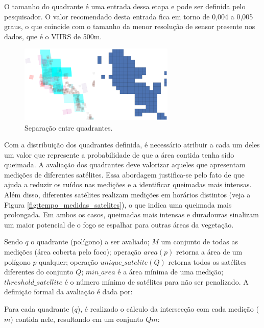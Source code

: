 \documentclass[cic,tc]{iiufrgs}
\begin{document}
O tamanho do quadrante é uma entrada dessa etapa e pode ser definida pelo pesquisador. O valor recomendado desta entrada fica em torno de 0,004 a 0,005 graus, o que coincide com o tamanho da menor resolução de sensor presente nos dados, que é o VIIRS de 500m. \par

\begin{figure}[H]
    \caption{Separação entre quadrantes.}
    \begin{center}
        \includegraphics[width=20em]{satellite_quads_split}
    \end{center}
    \label{fig:satellite_quads_split}
\end{figure}

Com a distribuição dos quadrantes definida, é necessário atribuir a cada um deles um valor que represente a probabilidade de que a área contida tenha sido queimada. A avaliação dos quadrantes deve valorizar aqueles que apresentam medições de diferentes satélites. Essa abordagem justifica-se pelo fato de que ajuda a reduzir os ruídos nas medições e a identificar queimadas mais intensas. Além disso, diferentes satélites realizam medições em horários distintos (veja a Figura \ref{fig:tempo_medidas_satelites}), o que indica uma queimada mais prolongada. Em ambos os casos, queimadas mais intensas e duradouras sinalizam um maior potencial de o fogo se espalhar para outras áreas da vegetação. \par

Sendo $q$ o quadrante (polígono) a ser avaliado; $M$ um conjunto de todas as medições (área coberta pelo foco); operação $area(p)$ retorna a área de um polígono $p$ qualquer; operação $unique\_satelite(Q)$ retorna todos os satélites diferentes do conjunto $Q$; $min\_area$ é a área mínima de uma medição; $threshold\_satellite$ é o número mínimo de satélites para não ser penalizado. A definição formal da avaliação é dada por: \par

Para cada quadrante ($q$), é realizado o cálculo da intersecção com cada medição ($m$) contida nele, resultando em um conjunto $Qm$: \par
\end{document}
